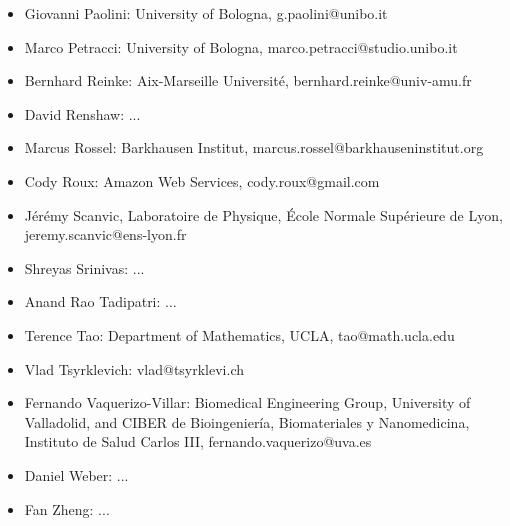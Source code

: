 \begin{itemize}
    \item Giovanni Paolini: University of Bologna, g.paolini@unibo.it
    \item Marco Petracci: University of Bologna, marco.petracci@studio.unibo.it
    \item Bernhard Reinke: Aix-Marseille Université, bernhard.reinke@univ-amu.fr
    \item David Renshaw: ...
    \item Marcus Rossel: Barkhausen Institut, marcus.rossel@barkhauseninstitut.org
    \item Cody Roux: Amazon Web Services, cody.roux@gmail.com
    \item J\'er\'emy Scanvic, Laboratoire de Physique, École Normale Supérieure de Lyon, jeremy.scanvic@ens-lyon.fr
    \item Shreyas Srinivas: ...
    \item Anand Rao Tadipatri: ...
    \item Terence Tao: Department of Mathematics, UCLA, tao@math.ucla.edu
    \item Vlad Tsyrklevich: vlad@tsyrklevi.ch
    \item Fernando Vaquerizo-Villar: Biomedical Engineering Group, University of Valladolid, and CIBER de Bioingeniería, Biomateriales y Nanomedicina, Instituto de Salud Carlos III, fernando.vaquerizo@uva.es
    \item Daniel Weber: ...
    \item Fan Zheng: ...

\end{itemize}

